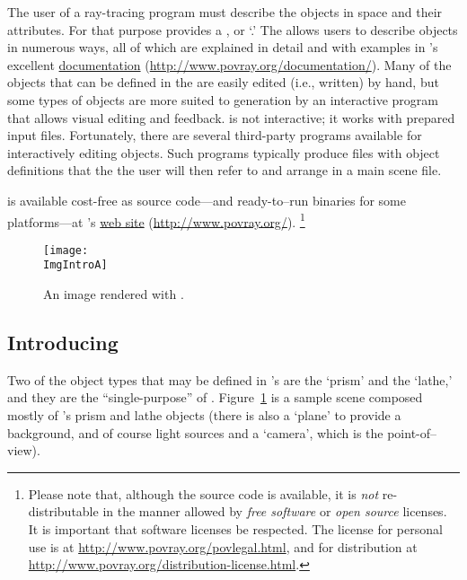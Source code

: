The user of a ray-tracing program must describe the objects in space
and their attributes. For that purpose \IXpov{} provides a
, or `.'
The 
allows users to describe objects in numerous ways, all of which
are explained in detail and with examples in \IXpov{}'s
excellent \href{http://www.povray.org/documentation/}{documentation}
(\url{http://www.povray.org/documentation/}).
Many of the objects that can be defined in the  are easily
edited (i.e., written) by hand, but some types of objects
are more suited to generation by an interactive program that
allows visual editing and feedback. \IXpov{} is not interactive;
it works with prepared input files. Fortunately, there are several
third-party programs available for interactively editing
\IXpov{}  objects. Such programs typically
produce  files with object definitions
that the the user will then refer to and arrange in a main scene file.

\IXpov{} is available cost-free as source code---and
ready-to--run binaries for some platforms---at
\IXpov's \href{http://www.povray.org/}{web site}
(\url{http://www.povray.org/}).
\footnote{Please note that, although the source code is available,
it is \emph{not} re-distributable in the manner allowed
by \emph{free software} or \emph{open source} licenses.
It is important that software licenses be respected.
The \IXpov{} license for personal use is at
\url{http://www.povray.org/povlegal.html}, and for distribution
at \url{http://www.povray.org/distribution-license.html}.}

\begin{figure}[htb]
\centering
\texttt{[image: \\ImgIntroA]}
\caption{An image rendered with \dtypov.}
\label{fig:pov_image_Intro_0}
\end{figure}


	\subsection{Introducing \dtypkgu}
Two of the object types that may be defined in \IXpov's
 are the `prism' and the `lathe,' and they are
the ``single-purpose'' of \IXpkg.
Figure~\ref{fig:pov_image_Intro_0} is a sample scene
composed mostly of \IXpov's prism and lathe objects
(there is also a `plane' to provide a background, and of course
light sources and a `camera', which is the point-of--view).

